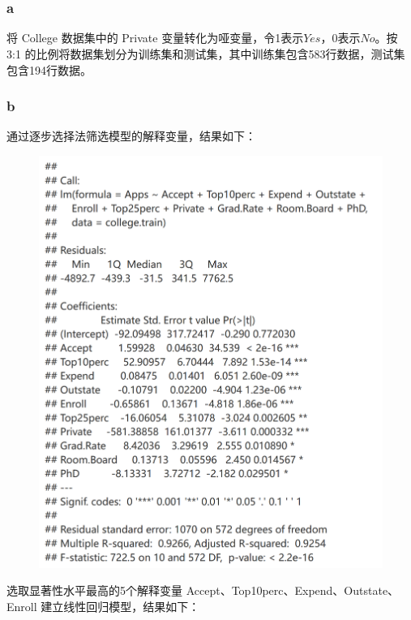 \documentclass[12pt,a4paper]{article}
\begin{document}
    \section{}
    \vspace{10pt}
    \subsubsection*{a}
    将 College 数据集中的 Private 变量转化为哑变量，令1表示$Yes$，0表示$No$。按 3:1 的比例将数据集划分为训练集和测试集，其中训练集包含583行数据，测试集包含194行数据。
    \subsubsection*{b}
    通过逐步选择法筛选模型的解释变量，结果如下：
    \begin{figure}[H]
        \centering
        \includegraphics[scale=0.25]{Stepwise.png}
    \end{figure}
    选取显著性水平最高的5个解释变量 Accept、Top10perc、Expend、Outstate、 Enroll 建立线性回归模型，结果如下：
\end{document}
